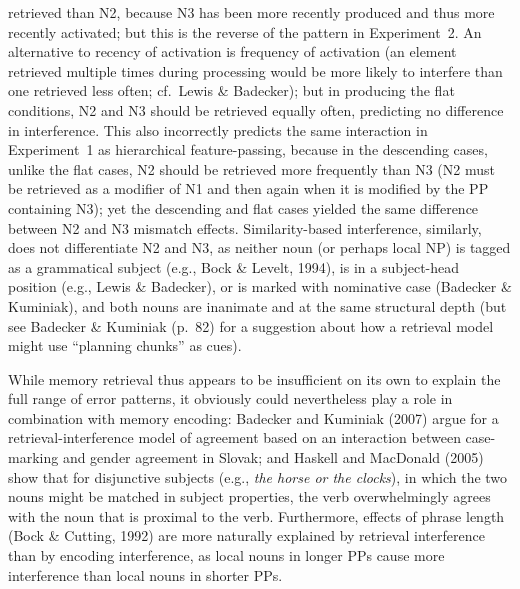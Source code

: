 \documentclass[12pt,titlepage]{article}
\newcommand{\itt}{\textit}  %
\newcommand{\IGNORE}[1]{} %
\begin{document}
retrieved than N2, because N3 has been more recently produced and thus more
recently activated; but this is the reverse of the pattern in Experiment~2.
An alternative to recency of activation is frequency of activation (an
element retrieved multiple times during processing would be more likely to
interfere than one retrieved less often; cf.\ Lewis \& Badecker); but in
producing the flat conditions, N2 and N3 should be retrieved equally often,
predicting no difference in interference.  This also incorrectly predicts
the same interaction in Experiment~1 as hierarchical feature-passing,
because in the descending cases, unlike the flat cases, N2 should be
retrieved more frequently than N3 (N2 must be retrieved as a modifier of N1
and then again when it is modified by the PP containing N3); yet the
descending and flat cases yielded the same difference between N2 and N3
mismatch effects.\IGNORE{ Lewis and Badecker found that removing the decay
component from their original production model did not decrease model
performance, and suggested that all interference effects in subject-verb
agreement result from similarity-based interference.  Similarity-based
interference, however,} Similarity-based interference, similarly, does not
differentiate N2 and N3, as neither noun (or perhaps local NP) is tagged as
a grammatical subject (e.g., Bock \& Levelt, 1994), is in a subject-head
position (e.g., Lewis \& Badecker), or is marked with nominative case
(Badecker \& Kuminiak), and both nouns are inanimate and at the same
structural depth (but see Badecker \& Kuminiak (p.~82) for a suggestion
about how a retrieval model might use ``planning chunks'' as cues).

While memory retrieval thus appears to be insufficient on its own to
explain the full range of error patterns, it obviously could nevertheless
play a role in combination with memory encoding: Badecker and Kuminiak
(2007) argue for a retrieval-interference model of agreement based on an
interaction between case-marking and gender agreement in Slovak; and
Haskell and MacDonald (2005) show that for disjunctive subjects (e.g.,
\itt{the horse or the clocks}), in which the two nouns might be matched in
subject properties, the verb overwhelmingly agrees with the noun that is
proximal to the verb.\IGNORE{ This effect may be explained by the
possibility that both nouns in a disjunction receive a subject flag, and
with all else being equal, the noun closest to the verb provides the
retreival cue for the verb as it was the most recently encounted and most
active noun with the correct grammatical properties triggering agreement.}
Furthermore, effects of phrase length (Bock \& Cutting, 1992) are more
naturally explained by retrieval interference than by encoding
interference, as local nouns in longer PPs cause more interference than
local nouns in shorter PPs.
\end{document}

